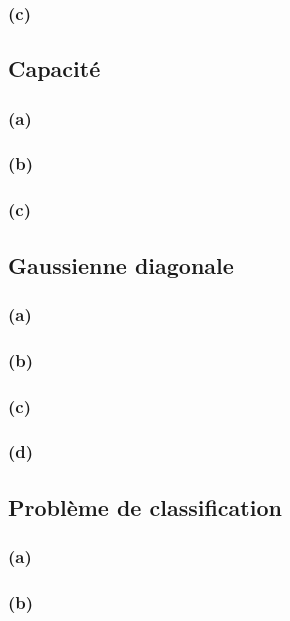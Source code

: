 \documentclass{article}
\begin{document}
	\subsubsection*{(c)}
	
	
	\subsection{Capacité}
	
	\subsubsection*{(a)}
	
	\subsubsection*{(b)}
	
	\subsubsection*{(c)}
	
	
	\subsection{Gaussienne diagonale}
	
	\subsubsection*{(a)}
	
	\subsubsection*{(b)}
	
	\subsubsection*{(c)}
	
	\subsubsection*{(d)}
	
	
	\subsection{Problème de classification}
		
	\subsubsection*{(a)}
		
	\subsubsection*{(b)}
	
\end{document}
